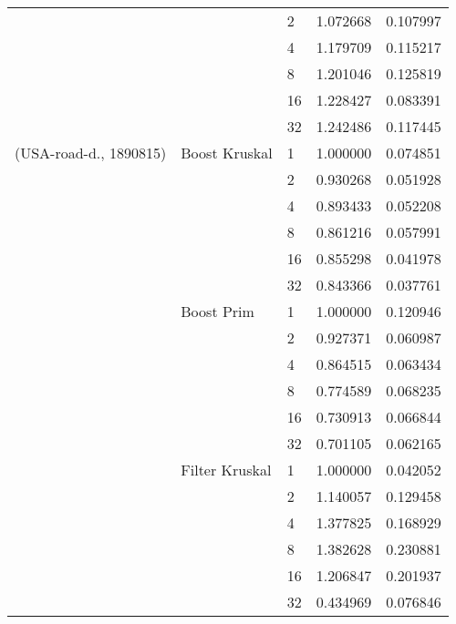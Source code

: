 \begin{tabular}{lllrr}
                       &                    & 2  &  1.072668 &  0.107997 \\
                       &                    & 4  &  1.179709 &  0.115217 \\
                       &                    & 8  &  1.201046 &  0.125819 \\
                       &                    & 16 &  1.228427 &  0.083391 \\
                       &                    & 32 &  1.242486 &  0.117445 \\
(USA-road-d., 1890815) & Boost Kruskal & 1  &  1.000000 &  0.074851 \\
                       &                    & 2  &  0.930268 &  0.051928 \\
                       &                    & 4  &  0.893433 &  0.052208 \\
                       &                    & 8  &  0.861216 &  0.057991 \\
                       &                    & 16 &  0.855298 &  0.041978 \\
                       &                    & 32 &  0.843366 &  0.037761 \\
                       & Boost Prim & 1  &  1.000000 &  0.120946 \\
                       &                    & 2  &  0.927371 &  0.060987 \\
                       &                    & 4  &  0.864515 &  0.063434 \\
                       &                    & 8  &  0.774589 &  0.068235 \\
                       &                    & 16 &  0.730913 &  0.066844 \\
                       &                    & 32 &  0.701105 &  0.062165 \\
                       & Filter Kruskal & 1  &  1.000000 &  0.042052 \\
                       &                    & 2  &  1.140057 &  0.129458 \\
                       &                    & 4  &  1.377825 &  0.168929 \\
                       &                    & 8  &  1.382628 &  0.230881 \\
                       &                    & 16 &  1.206847 &  0.201937 \\
                       &                    & 32 &  0.434969 &  0.076846 \\

\end{tabular}
